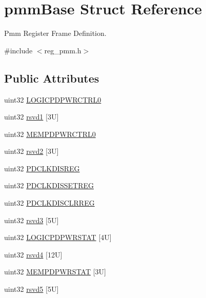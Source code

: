 \hypertarget{structpmmBase}{}\section{pmm\+Base Struct Reference}
\label{structpmmBase}


Pmm Register Frame Definition.  




{\ttfamily \#include $<$reg\+\_\+pmm.\+h$>$}

\subsection*{Public Attributes}
\begin{DoxyCompactItemize}
\item 
uint32 \mbox{\hyperlink{structpmmBase_a8010328934474fb622b3c0f12caf4f69}{L\+O\+G\+I\+C\+P\+D\+P\+W\+R\+C\+T\+R\+L0}}
\item 
uint32 \mbox{\hyperlink{structpmmBase_a37781915b006e7a4907940b2f1c84ea1}{rsvd1}} \mbox{[}3\+U\mbox{]}
\item 
uint32 \mbox{\hyperlink{structpmmBase_a83a2d707bcb7124e426d78c97ee77f5c}{M\+E\+M\+P\+D\+P\+W\+R\+C\+T\+R\+L0}}
\item 
uint32 \mbox{\hyperlink{structpmmBase_af0ab565096e8645ff78df6011bd31084}{rsvd2}} \mbox{[}3\+U\mbox{]}
\item 
uint32 \mbox{\hyperlink{structpmmBase_ab365a9f74ed1f9b80c502386a49c4473}{P\+D\+C\+L\+K\+D\+I\+S\+R\+EG}}
\item 
uint32 \mbox{\hyperlink{structpmmBase_a3e4d3dbe34d3a86a6c7cb59c38a84754}{P\+D\+C\+L\+K\+D\+I\+S\+S\+E\+T\+R\+EG}}
\item 
uint32 \mbox{\hyperlink{structpmmBase_a8c0d6a62a65cdf5495ab9a28561ab5ff}{P\+D\+C\+L\+K\+D\+I\+S\+C\+L\+R\+R\+EG}}
\item 
uint32 \mbox{\hyperlink{structpmmBase_a662d467725e752cf6a60b332ddf1337e}{rsvd3}} \mbox{[}5\+U\mbox{]}
\item 
uint32 \mbox{\hyperlink{structpmmBase_afebfb1038a676cca54d8545cd0b93041}{L\+O\+G\+I\+C\+P\+D\+P\+W\+R\+S\+T\+AT}} \mbox{[}4\+U\mbox{]}
\item 
uint32 \mbox{\hyperlink{structpmmBase_aca85a93099add3a460c4cdd02b39fdf8}{rsvd4}} \mbox{[}12\+U\mbox{]}
\item 
uint32 \mbox{\hyperlink{structpmmBase_a84b8a30f5425d6082a63cf5a891e06dc}{M\+E\+M\+P\+D\+P\+W\+R\+S\+T\+AT}} \mbox{[}3\+U\mbox{]}
\item 
uint32 \mbox{\hyperlink{structpmmBase_a306ae9db50ce5504899d5f4e62d38fad}{rsvd5}} \mbox{[}5\+U\mbox{]}

\end{DoxyCompactItemize}
